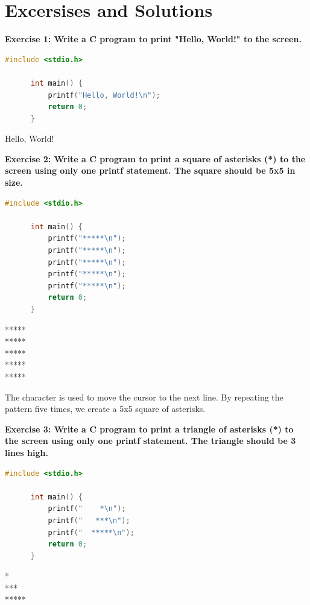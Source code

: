\documentclass[12pt, openany]{book}
\begin{document}
  \section{Excersises and Solutions}
  \textbf{Exercise 1: Write a C program to print "Hello, World!" to the screen.}
  
  \begin{lstlisting}[language=C, caption=Solution to Exercise 1]
      #include <stdio.h>
      
      int main() {
          printf("Hello, World!\n");
          return 0;
      }
  \end{lstlisting}
  \begin{tcolorbox}[colback=lightgray!10, colframe=black, title=Output]
      Hello, World!
  \end{tcolorbox}
  \vspace{10pt}
  \noindent\textbf{Exercise 2: Write a C program to print a square of asterisks (*) to the screen using only one printf statement. The square should be 5x5 in size.}
  
  \begin{lstlisting}[language=C, caption=Solution to Exercise 2]
      #include <stdio.h>
      
      int main() {
          printf("*****\n");
          printf("*****\n");
          printf("*****\n");
          printf("*****\n");
          printf("*****\n");
          return 0;
      }
  \end{lstlisting}
  \begin{tcolorbox}[colback=lightgray!10, colframe=black, title=Output]
      ***** \\
      ***** \\
      ***** \\
      ***** \\
      *****
  \end{tcolorbox}
  
  \begin{infobox}
  The  character is used to move the cursor to the next line. By repeating the pattern  five times, we create a 5x5 square of asterisks.
  \end{infobox}
  
  \noindent\textbf{Exercise 3: Write a C program to print a triangle of asterisks (*) to the screen using only one printf statement. The triangle should be 3 lines high.}
  
  \begin{lstlisting}[language=C, caption=Solution to Exercise 3]
      #include <stdio.h>
  
      int main() {
          printf("    *\n");
          printf("   ***\n");
          printf("  *****\n");
          return 0;
      }
  \end{lstlisting}
  \begin{tcolorbox}[colback=lightgray!10, colframe=black, title=Output]
      \makebox[12pt]{ }* \\  
      \makebox[6pt]{ }*** \\  
      *****  
  \end{tcolorbox}
  
\end{document}
